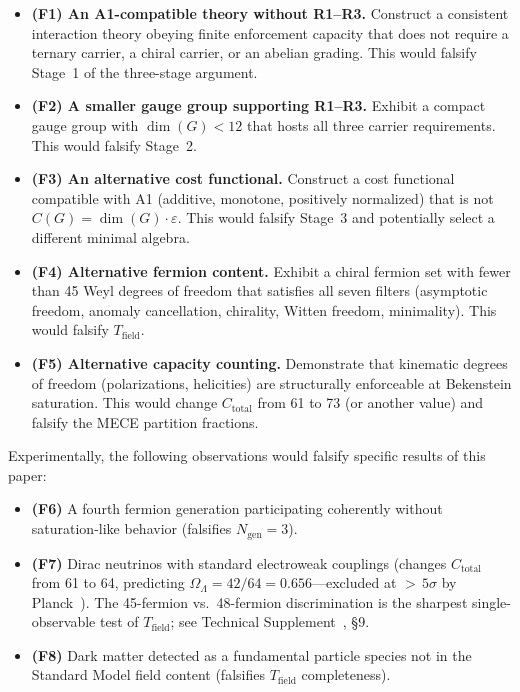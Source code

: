 \documentclass[11pt]{article}
\newenvironment{varlist}{\begin{itemize}[nosep,leftmargin=2em]}{\end{itemize}}
\begin{document}
\begin{varlist}
\item \textbf{(F1) An A1-compatible theory without R1--R3.}  Construct a consistent interaction theory obeying finite enforcement capacity that does not require a ternary carrier, a chiral carrier, or an abelian grading.  This would falsify Stage~1 of the three-stage argument.
\item \textbf{(F2) A smaller gauge group supporting R1--R3.}  Exhibit a compact gauge group with $\dim(G) < 12$ that hosts all three carrier requirements.  This would falsify Stage~2.
\item \textbf{(F3) An alternative cost functional.}  Construct a cost functional compatible with A1 (additive, monotone, positively normalized) that is not $C(G) = \dim(G) \cdot \varepsilon$.  This would falsify Stage~3 and potentially select a different minimal algebra.
\item \textbf{(F4) Alternative fermion content.}  Exhibit a chiral fermion set with fewer than 45 Weyl degrees of freedom that satisfies all seven filters (asymptotic freedom, anomaly cancellation, chirality, Witten freedom, minimality).  This would falsify $T_{\mathrm{field}}$.
\item \textbf{(F5) Alternative capacity counting.}  Demonstrate that kinematic degrees of freedom (polarizations, helicities) are structurally enforceable at Bekenstein saturation.  This would change $C_{\mathrm{total}}$ from 61 to 73 (or another value) and falsify the MECE partition fractions.
\end{varlist}

Experimentally, the following observations would falsify specific results of this paper:

\begin{varlist}
\item \textbf{(F6)} A fourth fermion generation participating coherently without saturation-like behavior (falsifies $N_{\mathrm{gen}} = 3$).
\item \textbf{(F7)} Dirac neutrinos with standard electroweak couplings (changes $C_{\mathrm{total}}$ from 61 to 64, predicting $\Omega_\Lambda = 42/64 = 0.656$---excluded at ${>}\,5\sigma$ by Planck~\cite{Planck2020}).  The 45-fermion vs.\ 48-fermion discrimination is the sharpest single-observable test of $T_{\mathrm{field}}$; see Technical Supplement~\cite{BrookeP2Supplement}, \S9.
\item \textbf{(F8)} Dark matter detected as a fundamental particle species not in the Standard Model field content (falsifies $T_{\mathrm{field}}$ completeness).
\end{varlist}
\end{document}
